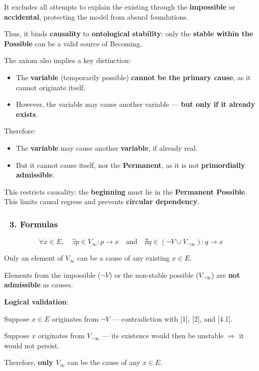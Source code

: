 \documentclass[12pt]{article}
\begin{document}
It excludes all attempts to explain the existing through the \textbf{impossible} or \textbf{accidental}, protecting the model from absurd foundations.

Thus, it binds \textbf{causality} to \textbf{ontological stability}: only the \textbf{stable within the Possible} can be a valid source of Becoming.

\bigskip
The axiom also implies a key distinction:
\begin{itemize}
\item The \textbf{variable} (temporarily possible) \textbf{cannot be the primary cause}, as it cannot originate itself.
\item However, the variable may cause another variable — \textbf{but only if it already exists}.
\end{itemize}

Therefore:
\begin{itemize}
\item The \textbf{variable} may cause another \textbf{variable}, if already real.
\item But it cannot cause itself, nor the \textbf{Permanent}, as it is not \textbf{primordially admissible}.
\end{itemize}

This restricts causality: the \textbf{beginning} must lie in the \textbf{Permanent Possible}. This limits causal regress and prevents \textbf{circular dependency}.

\subsubsection*{🔹 3. Formulas}
\[
\forall x \in E,\quad \exists p \in V_\infty: p \rightarrow x 
\quad \text{and} \quad \nexists q \in (\neg V \cup V_{\neg\infty}) : q \rightarrow x
\]

Only an element of $V_\infty$ can be a cause of any existing $x \in E$.

Elements from the impossible ($\neg V$) or the non-stable possible ($V_{\neg\infty}$) are \textbf{not admissible} as causes.

\bigskip
\textbf{Logical validation}:

Suppose $x \in E$ originates from $\neg V$ — contradiction with [1], [2], and [4.1].

Suppose $x$ originates from $V_{\neg\infty}$ — its existence would then be unstable $\Rightarrow$ it would not persist.

Therefore, \textbf{only $V_\infty$} can be the cause of any $x \in E$.
\end{document}
